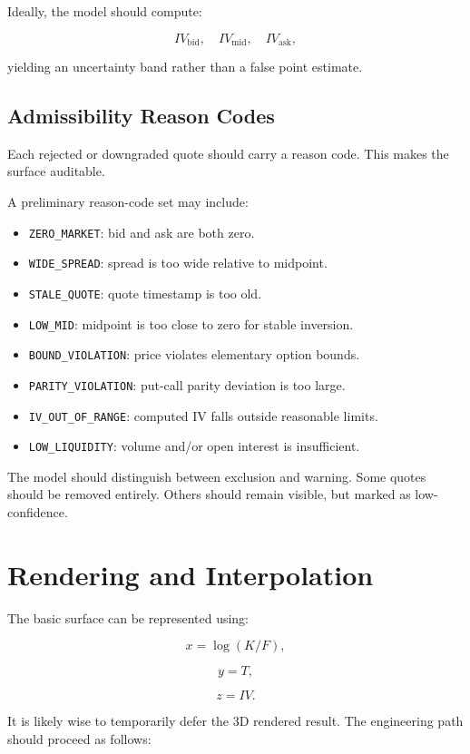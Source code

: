 \documentclass[11pt]{article}
\begin{document}
Ideally, the model should compute:

\[
IV_{\text{bid}}, \quad IV_{\text{mid}}, \quad IV_{\text{ask}},
\]

yielding an uncertainty band rather than a false point estimate.

\subsection{Admissibility Reason Codes}

Each rejected or downgraded quote should carry a reason code. This makes the surface auditable.

A preliminary reason-code set may include:

\begin{itemize}[leftmargin=1.5em]
    \item \texttt{ZERO\_MARKET}: bid and ask are both zero.
    \item \texttt{WIDE\_SPREAD}: spread is too wide relative to midpoint.
    \item \texttt{STALE\_QUOTE}: quote timestamp is too old.
    \item \texttt{LOW\_MID}: midpoint is too close to zero for stable inversion.
    \item \texttt{BOUND\_VIOLATION}: price violates elementary option bounds.
    \item \texttt{PARITY\_VIOLATION}: put-call parity deviation is too large.
    \item \texttt{IV\_OUT\_OF\_RANGE}: computed IV falls outside reasonable limits.
    \item \texttt{LOW\_LIQUIDITY}: volume and/or open interest is insufficient.
\end{itemize}

The model should distinguish between exclusion and warning. Some quotes should be removed entirely. Others should remain visible, but marked as low-confidence.

\section{Rendering and Interpolation}

The basic surface can be represented using:

\[
x = \log(K/F),
\]

\[
y = T,
\]

\[
z = IV.
\]

It is likely wise to temporarily defer the 3D rendered result. The engineering path should proceed as follows:
\end{document}

